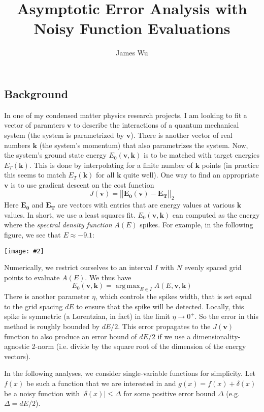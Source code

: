\documentclass[letterpaper,11pt]{article}
\title{Asymptotic Error Analysis with Noisy Function Evaluations}
\author{James Wu \quad 92277235}
\date{}
\newcommand*{\abs}[1]{\left| #1 \right|}
\newcommand*{\norm}[1]{\abs{\abs{#1}}}
\DeclareMathOperator*{\argmax}{arg\,max}
\newcommand*{\qimg}[2]{\\ \begin{center}\texttt{[image: \#2]}\end{center}}
\begin{document}
\maketitle
\begin{flushleft}
    
    \section{Background}
    In one of my condensed matter physics research projects, I am looking to fit a vector of paramters $\mathbf{v}$ to describe the interactions of a quantum mechanical system (the system is parametrized by $\mathbf{v}$). There is another vector of real numbers $\mathbf{k}$ (the system's momentum) that also parametrizes the system. Now, the system's ground state energy $E_0(\mathbf{v}, \mathbf{k})$ is to be matched with target energies $E_T(\mathbf{k})$. This is done by interpolating for a finite number of $\mathbf{k}$ points (in practice this seems to match $E_T(\mathbf{k})$ for all $\mathbf{k}$ quite well). One way to find an appropriate $\mathbf{v}$ is to use gradient descent on the cost function
    $$J(\mathbf{v}) = \norm{\mathbf{E_0}(\mathbf{v}) - \mathbf{E_T}}_2$$
    Here $\mathbf{E_0}$ and $\mathbf{E_T}$ are vectors with entries that are energy values at various $\mathbf{k}$ values. In short, we use a least squares fit. $E_0(\mathbf{v}, \mathbf{k})$ can computed as the energy where the \textit{spectral density function} $A(E)$ spikes. For example, in the following figure, we see that $E \approx -9.1$:
    \qimg{0.8}{img/spec.jpg}
    Numerically, we restrict ourselves to an interval $I$ with $N$ evenly spaced grid points to evaluate $A(E)$. We thus have
    $$E_0(\mathbf{v}, \mathbf{k}) = \argmax_{E \in I} A(E, \mathbf{v}, \mathbf{k})$$
    There is another parameter $\eta$, which controls the spikes width, that is set equal to the grid spacing $dE$ to ensure that the spike will be detected. Locally, this spike is symmetric (a Lorentzian, in fact) in the limit $\eta \to 0^+$. So the error in this method is roughly bounded by $dE/2$. This error propagates to the $J(\mathbf{v})$ function to also produce an error bound of $dE/2$ if we use a dimensionality-agnostic 2-norm (i.e. divide by the square root of the dimension of the energy vectors).

    In the following analyses, we consider single-variable functions for simplicity. Let $f(x)$ be such a function that we are interested in and $g(x) = f(x) + \delta(x)$ be a noisy function with $|\delta(x)| \leq \Delta$ for some positive error bound $\Delta$ (e.g. $\Delta = dE/2$).


\end{flushleft}
\end{document}
